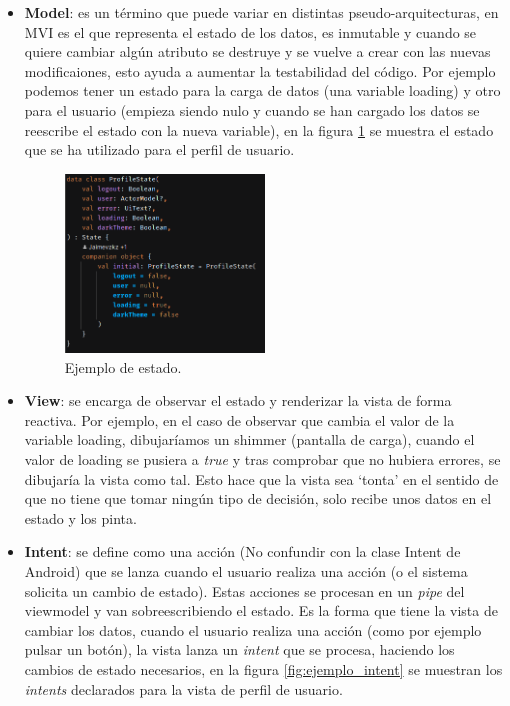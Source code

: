 \begin{itemize}
    \item \textbf{Model}: es un término que puede variar en distintas pseudo-arquitecturas, en MVI es el que representa el estado de los datos, es inmutable y cuando se quiere cambiar algún atributo se destruye y se vuelve a crear con las nuevas modificaiones, esto ayuda a aumentar la testabilidad del código. Por ejemplo podemos tener un estado para la carga de datos (una  variable loading) y otro para el usuario (empieza siendo nulo y cuando se han cargado los datos se reescribe el estado con la nueva variable), en la figura \ref{fig:ejemplo_estado} se muestra el estado que se ha utilizado para el perfil de usuario.
    \begin{figure}[h]
        \centering
        \includegraphics[width = 0.5\textwidth]{Imagenes/Fuentes/ejemplo_estado.png}
        \caption{Ejemplo de estado.}
        \label{fig:ejemplo_estado}
    \end{figure}
    \item \textbf{View}: se encarga de observar el estado y renderizar la vista de forma reactiva. Por ejemplo, en el caso de observar que cambia el valor de la variable loading, dibujaríamos un shimmer (pantalla de carga), cuando el valor de loading se pusiera a \textit{true} y tras comprobar que no hubiera errores, se dibujaría la vista como tal. Esto hace que la vista sea ‘tonta’ en el sentido de que no tiene que tomar ningún tipo de decisión, solo recibe unos datos en el estado y los pinta.
    \item \textbf{Intent}: se define como una acción (No confundir con la clase Intent de Android\hyperlink{cap:biblio}{}) que se lanza cuando el usuario realiza una acción (o el sistema solicita un cambio de estado). Estas acciones se procesan en un \textit{pipe} del viewmodel y van sobreescribiendo el estado. Es la forma que tiene la vista de cambiar los datos, cuando el usuario realiza una acción (como por ejemplo pulsar un botón), la vista lanza un \textit{intent} que se procesa, haciendo los cambios de estado necesarios, en la figura \ref{fig:ejemplo_intent} se muestran los \textit{intents} declarados para la vista de perfil de usuario.

\end{itemize}
